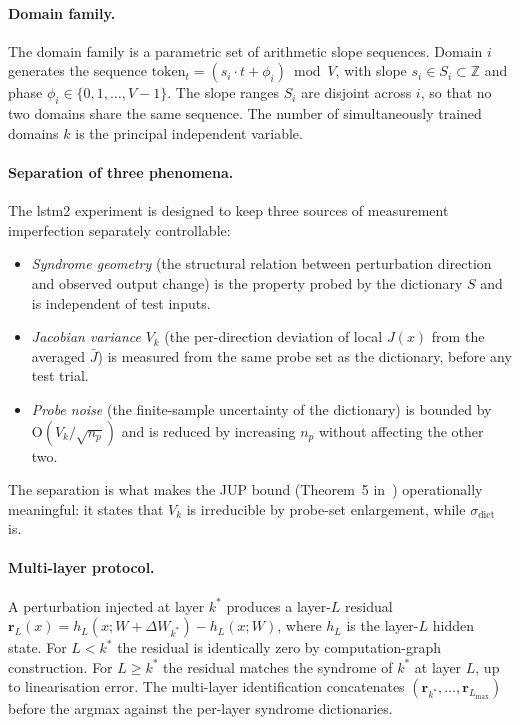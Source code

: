 \documentclass[11pt,a4paper]{article}
\newcommand{\Jbar}{\bar{J}}
\begin{document}
\paragraph{Domain family.}
The domain family is a parametric set of arithmetic slope sequences. Domain $i$ generates the sequence $\mathrm{token}_t = (s_i \cdot t +
\phi_i) \bmod V$, with slope $s_i \in S_i \subset \mathbb{Z}$ and phase $\phi_i \in \{0, 1, \ldots, V - 1\}$. The slope ranges $S_i$ are disjoint across $i$, so that no two domains share the same sequence. The number of simultaneously trained domains $k$ is the principal independent variable.

\paragraph{Separation of three phenomena.}
The lstm2 experiment is designed to keep three sources of measurement imperfection separately controllable:
\begin{itemize}[nosep]
\item \emph{Syndrome geometry} (the structural relation between perturbation direction and observed output change) is the property probed by the dictionary $S$ and is independent of test inputs.
\item \emph{Jacobian variance} $V_k$ (the per-direction deviation of local $J(x)$ from the averaged $\Jbar$) is measured from the same probe set as the dictionary, before any test trial.
\item \emph{Probe noise} (the finite-sample uncertainty of the dictionary) is bounded by $\mathrm{O}(V_k / \sqrt{n_p})$ and is reduced by increasing $n_p$ without affecting the other two.
\end{itemize}
The separation is what makes the JUP bound (Theorem~5 in~\cite{SyndromeAlgebra}) operationally meaningful: it states that $V_k$ is irreducible by probe-set enlargement, while $\sigma_{\mathrm{dict}}$ is.

\paragraph{Multi-layer protocol.}
A perturbation injected at layer $k^*$ produces a layer-$L$ residual $\mathbf{r}_L(x) = h_L(x; W + \Delta W_{k^*}) - h_L(x; W)$, where $h_L$ is the layer-$L$ hidden state. For $L < k^*$ the residual is identically zero by computation-graph construction. For $L \geq k^*$ the residual matches the syndrome of $k^*$ at layer $L$, up to linearisation error. The multi-layer identification concatenates $(\mathbf{r}_{k^*}, \ldots, \mathbf{r}_{L_{\max}})$ before the argmax against the per-layer syndrome dictionaries.
\end{document}
